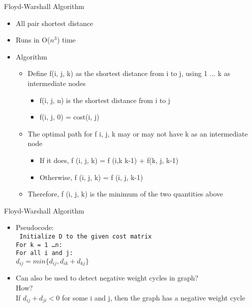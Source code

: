 \documentclass{beamer}
\begin{document}
\begin{frame}[<+->]{Floyd-Warshall Algorithm}
\begin{block}{}
  \begin{itemize}
    \item All pair shortest distance
    \item Runs in O($n^3$) time
    \item Algorithm\\
    \begin{itemize}
      \item Define f(i, j, k) as the shortest distance from i to j, using 1 ... k as intermediate nodes\\
	\begin{itemize}
	  \item f(i, j, n) is the shortest distance from i to j
	  \item f(i, j, 0) = cost(i, j)
	\end{itemize}
      \item The optimal path for f i, j, k may or may not have k as an intermediate node\\
	\begin{itemize}
	  \item If it does, f (i, j, k) = f (i,k k-1) + f(k, j, k-1)
	  \item Otherwise, f (i, j, k) = f (i, j, k-1)
	\end{itemize}
      \item Therefore, f (i, j, k) is the minimum of the two quantities above
      \end{itemize}
  \end{itemize}
\end{block}
\end{frame}

\begin{frame}[<+->]{Floyd-Warshall Algorithm}
\begin{block}{}
  \begin{itemize}
    \item Pseudocode:\\
    \tt{
      \hspace{2mm} Initialize D to the given cost matrix\\
      \hspace{2mm} For k = 1 \dots n:\\
      \hspace{2mm} For all i and j:\\
	  \hspace{6mm} $d_{ij} = min\{d_{ij}, d_{ik} + d_{kj}\}$
      }
      \item Can also be used to detect negative weight cycles in graph?\\
	\pause How?\\
	\pause If $d_{ij}+d_{ji} < 0$ for some i and j, then the graph has a negative weight cycle
  \end{itemize}
\end{block}
\end{frame}
\end{document}
